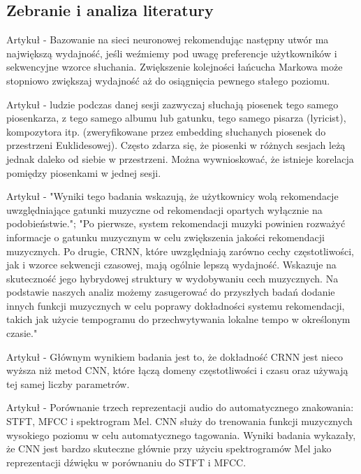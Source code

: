 \documentclass[a4paper,titleauthor]{mwart}
\begin{document}
\subsection{Zebranie i analiza literatury}
Artykuł \cite{hsu2016neural} - Bazowanie na sieci neuronowej rekomendując następny utwór ma największą wydajność, jeśli weźmiemy pod uwagę preferencje użytkowników i sekwencyjne wzorce słuchania. Zwiększenie kolejności łańcucha Markowa może stopniowo zwiększaj wydajność aż do osiągnięcia pewnego stałego poziomu.

Artykuł \cite{ji2015next} - ludzie podczas danej sesji zazwyczaj słuchają piosenek tego samego piosenkarza, z tego samego albumu lub gatunku, tego samego pisarza (lyricist), kompozytora itp. (zweryfikowane przez embedding słuchanych piosenek do przestrzeni Euklidesowej). Często zdarza się, że piosenki w różnych sesjach leżą jednak daleko od siebie w przestrzeni. Można wywnioskować, że istnieje korelacja pomiędzy piosenkami w jednej sesji. 

Artykuł \cite{gunawan2019music} - "Wyniki tego badania wskazują, że użytkownicy wolą rekomendacje uwzględniające gatunki muzyczne od rekomendacji opartych wyłącznie na podobieństwie."; "Po pierwsze, system rekomendacji muzyki powinien rozważyć informacje o gatunku muzycznym w celu zwiększenia jakości rekomendacji muzycznych. Po drugie, CRNN, które uwzględniają zarówno cechy częstotliwości, jak i wzorce sekwencji czasowej, mają ogólnie lepszą wydajność. Wskazuje na skuteczność jego hybrydowej struktury w wydobywaniu cech muzycznych. Na podstawie naszych analiz możemy zasugerować do przyszłych badań dodanie innych funkcji muzycznych w celu poprawy dokładności systemu rekomendacji, takich jak użycie tempogramu do przechwytywania lokalne tempo w określonym czasie."

Artykuł \cite{choi2017convolutional} - Głównym wynikiem badania jest to, że dokładność CRNN jest nieco wyższa niż metod CNN, które łączą domeny częstotliwości i czasu oraz używają tej samej liczby parametrów.

Artykuł \cite{choi2016automatic} - Porównanie trzech reprezentacji audio do automatycznego znakowania: STFT, MFCC i spektrogram Mel. CNN służy do trenowania funkcji muzycznych wysokiego poziomu w celu automatycznego tagowania. Wyniki badania wykazały, że CNN jest bardzo skuteczne głównie przy użyciu spektrogramów Mel jako reprezentacji dźwięku w porównaniu do STFT i MFCC.
\end{document}
